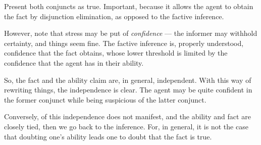 \documentclass[10pt]{article}
\begin{document}
Present both conjuncts as true.
Important, because it allows the agent to obtain the fact by disjunction elimination, as opposed to the factive inference.

{
  \color{red}
  However, note that stress may be put of \emph{confidence} --- the informer may withhold certainty, and things seem fine.
  The factive inference is, properly understood, confidence that the fact obtains, whose lower threshold is limited by the confidence that the agent has in their ability.

  So, the fact and the ability claim are, in general, independent.
  With this way of rewriting things, the independence is clear.
  The agent may be quite confident in the former conjunct while being suspicious of the latter conjunct.

  Conversely, of this independence does not manifest, and the ability and fact are closely tied, then we go back to the inference.
  For, in general, it is not the case that doubting one's ability leads one to doubt that the fact is true.
}
\end{document}
